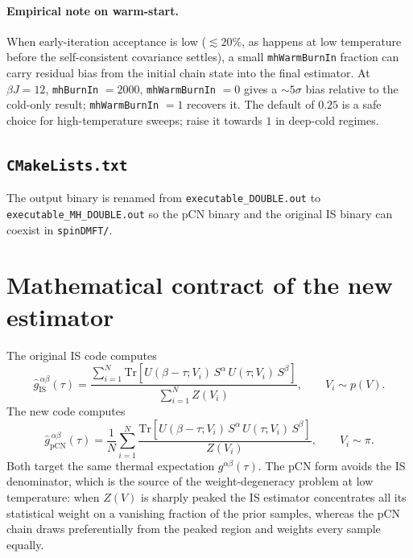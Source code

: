 \documentclass[11pt]{article}
\newcommand{\file}[1]{\texttt{#1}}
\newcommand{\code}[1]{\texttt{#1}}
\newcommand{\Tr}{\mathrm{Tr}}
\begin{document}
\paragraph{Empirical note on warm-start.}  When early-iteration acceptance is low
($\lesssim 20\%$, as happens at low temperature before the self-consistent
covariance settles), a small \code{mhWarmBurnIn} fraction can carry residual
bias from the initial chain state into the final estimator.  At
$\beta J = 12$, \code{mhBurnIn} $= 2000$, \code{mhWarmBurnIn} $= 0$ gives a
$\sim 5\sigma$ bias relative to the cold-only result; \code{mhWarmBurnIn} $= 1$
recovers it.  The default of $0.25$ is a safe choice for high-temperature
sweeps; raise it towards $1$ in deep-cold regimes.

\subsection{\file{CMakeLists.txt}}

The output binary is renamed from \code{executable\_DOUBLE.out} to
\code{executable\_MH\_DOUBLE.out} so the pCN binary and the original IS binary
can coexist in \file{spinDMFT/}.

\section{Mathematical contract of the new estimator}

The original IS code computes
\begin{equation}
    \widehat{g}_{\mathrm{IS}}^{\,\alpha\beta}(\tau)
    = \frac{\sum_{i=1}^N \Tr[U(\beta{-}\tau;V_i)\,S^\alpha\,U(\tau;V_i)\,S^\beta]}
           {\sum_{i=1}^N Z(V_i)},
    \qquad V_i \sim p(V).
\end{equation}
The new code computes
\begin{equation}
    \widehat{g}_{\mathrm{pCN}}^{\,\alpha\beta}(\tau)
    = \frac{1}{N}\sum_{i=1}^N
      \frac{\Tr[U(\beta{-}\tau;V_i)\,S^\alpha\,U(\tau;V_i)\,S^\beta]}{Z(V_i)},
    \qquad V_i \sim \pi.
\end{equation}
Both target the same thermal expectation $g^{\alpha\beta}(\tau)$.  The pCN form
avoids the IS denominator, which is the source of the weight-degeneracy problem
at low temperature: when $Z(V)$ is sharply peaked the IS estimator concentrates
all its statistical weight on a vanishing fraction of the prior samples, whereas
the pCN chain draws preferentially from the peaked region and weights every
sample equally.
\end{document}
